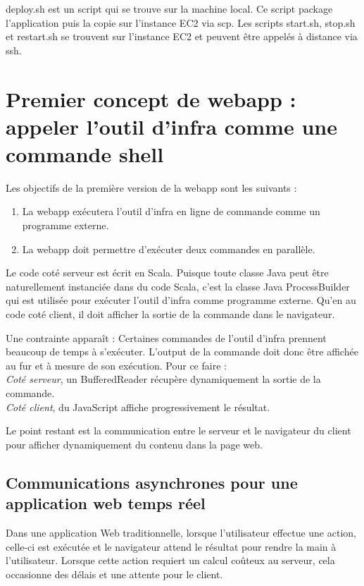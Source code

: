 deploy.sh est un script qui se trouve sur la machine local.
Ce script package l'application puis la copie sur l'instance EC2 via scp.
Les scripts start.sh, stop.sh et restart.sh se trouvent sur l'instance EC2 et
peuvent être appelés à distance via ssh.


\section{Premier concept de webapp : appeler l'outil d'infra comme une commande
  shell}
\noindent Les objectifs de la première version de la webapp sont les suivants :
\begin{enumerate}
\item La webapp exécutera l'outil d'infra en ligne de commande comme un
  programme externe.
\item La webapp doit permettre d'exécuter deux commandes en parallèle.
\end{enumerate}

Le code coté serveur est écrit en Scala.
Puisque toute classe Java peut être naturellement instanciée dans du code Scala,
c'est la classe Java ProcessBuilder qui est utilisée pour exécuter
l'outil d'infra comme programme externe.
Qu'en au code coté client, il doit afficher la sortie de la commande dans le
navigateur.

Une contrainte apparaît :
Certaines commandes de l'outil d'infra prennent beaucoup de temps à s'exécuter.
L'output de la commande doit donc être affichée au fur et à mesure de son
exécution. Pour ce faire :\\
\textit{Coté serveur}, un BufferedReader récupère dynamiquement la sortie de la commande.\\
\textit{Coté client}, du JavaScript affiche progressivement le résultat.

Le point restant est la communication entre le serveur et le navigateur du
client pour afficher dynamiquement du contenu dans la page web.

\subsection{Communications asynchrones pour une application web temps réel}

Dans une application Web traditionnelle, lorsque l'utilisateur effectue une
action, celle-ci est exécutée et le navigateur attend le résultat pour rendre
la main à l'utilisateur. Lorsque cette action requiert un calcul coûteux
au serveur, cela occasionne des délais et une attente pour le client.

